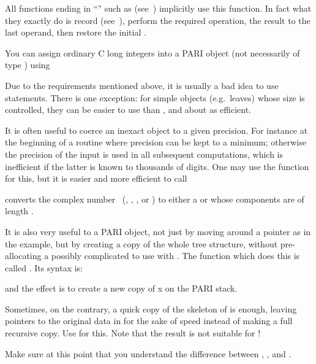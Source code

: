 All functions ending in ``'' such as 
(see~) implicitly use this function. In fact what they
exactly do is record {} (see~), perform the
required operation,  the result to the last operand, then
restore the initial .

You can assign ordinary C long integers into a PARI object (not necessarily
of type ) using


 Due to the requirements mentioned above, it is usually
a bad idea to use  statements. There is one exception: for simple
objects (e.g.~leaves) whose size is controlled, they can be easier to use than
, and about as efficient.

 It is often useful to coerce an inexact object to a
given precision. For instance at the beginning of a routine where precision
can be kept to a minimum; otherwise the precision of the input is used in all
subsequent computations, which is inefficient if the latter is known to
thousands of digits. One may use the  function for this, but it
is easier and more efficient to call

 converts the complex number~
(, , ,  or ) to either
a  or  whose components are  of length
.

 It is also very useful to  a PARI object, not
just by moving around a pointer as in the  example, but by
creating a copy of the whole tree structure, without pre-allocating a
possibly complicated  to use with . The function which
does this is called . Its syntax is:


\noindent and the effect is to create a new copy of x on the PARI stack.

Sometimes, on the contrary, a quick copy of the skeleton of  is
enough, leaving pointers to the original data in  for the sake of
speed instead of making a full recursive copy. Use
 for this. Note that the result is not suitable
for  !

Make sure at this point that you understand the difference between , ,  and .

